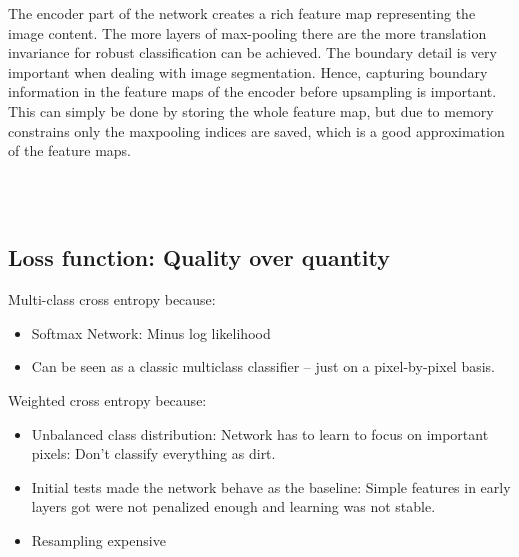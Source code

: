 \documentclass[12pt,fleqn]{article}
\begin{document}
The encoder part of the network creates a rich feature map representing the image content. The more 
layers of max-pooling there are the more translation invariance for robust 
classification can be achieved. The boundary detail is very important when 
dealing with image segmentation. Hence, capturing boundary information in 
the feature maps of the encoder before upsampling is important. This can 
simply be done by storing the whole feature map, but due to memory 
constrains only the maxpooling indices are saved, which is a good 
approximation of the feature maps. 

\\
\\
\subsection{Loss function: Quality over quantity}
Multi-class cross entropy because:
\begin{itemize}
	\item Softmax Network: Minus log likelihood
	\item Can be seen as a classic multiclass classifier -- just on a pixel-by-pixel basis.
\end{itemize}
Weighted cross entropy because:
\begin{itemize}
	\item Unbalanced class distribution: Network has to learn to focus on important pixels: Don't classify everything as dirt.
	\item Initial tests made the network behave as the baseline: Simple features in early layers got were not penalized enough and learning was not stable.
	\item Resampling expensive
\end{itemize}
\end{document}
